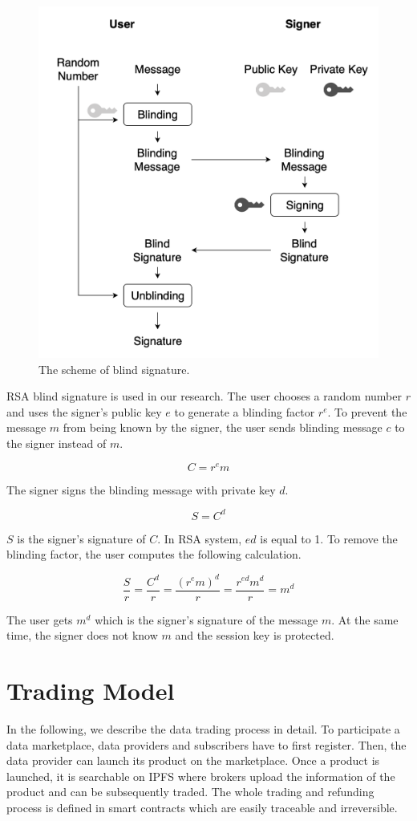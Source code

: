 \documentclass[conference]{IEEEtran}
\begin{document}
\begin{figure}[!t]
	\centering
	\includegraphics[width=2. in]{blind_signature}
	\caption{The scheme of blind signature.}
	\label{fig:blind_signature}
\end{figure}

RSA blind signature\cite{cryptoNote} is used in our research. The user chooses a random number $r$ and uses the signer's public key $e$ to generate a blinding factor $r^e$. To prevent the message $m$ from being known by the signer, the user sends blinding message $c$ to the signer instead of $m$.

\begin{equation}
C = r^e m
\end{equation}

The signer signs the blinding message with private key $d$.

\begin{equation}
S = C^d
\end{equation}

$S$ is the signer's signature of $C$. In RSA system, $ed$ is equal to 1. To remove the blinding factor, the user computes the following calculation.

\begin{equation}
\frac{S}{r}= \frac{C^d}{r} = \frac{(r^e m)^d}{r} = \frac{r^{ed} m^d}{r} = m^d
\end{equation}
 
The user gets $m^d$ which is the signer's signature of the message $m$. At the same time, the signer does not know $m$ and the session key is protected. 

\section{Trading Model}
In the following, we describe the data trading process in detail. To participate a data marketplace, data providers and subscribers have to first register. Then,  the data provider can launch its product on the marketplace. Once a product is launched, it is searchable on IPFS where brokers upload the information of the product and can be subsequently traded. The whole trading and refunding process is defined in smart contracts which are easily traceable and irreversible.
\end{document}
